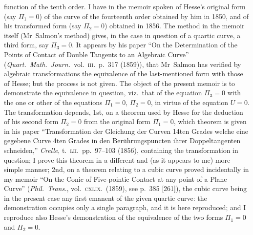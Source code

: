 \documentclass[11pt]{article}
\begin{document}
\noindent function of the tenth order. I have in the memoir spoken of Hesse's original form (say $\Pi_1 = 0$) of the curve of the fourteenth order obtained by him in 1850, and of his transformed form (say $\Pi_2 = 0$) obtained in 1856. The method in the memoir itself (Mr~Salmon's method) gives, in the case in question of a quartic curve, a third form, say $\Pi_3 = 0$. It appears by his paper ``On the Determination of the Points of Contact of Double Tangents to an Algebraic Curve'' (\textit{Quart.\ Math.\ Journ.}\ vol.~\textsc{iii}.\ p.~317 (1859)), that Mr~Salmon has verified by algebraic transformations the equivalence of the last-mentioned form with those of Hesse; but the process is not given. The object of the present memoir is to demonstrate the equivalence in question, viz.\ that of the equation $\Pi_3 = 0$ with the one or other of the equations $\Pi_1 = 0$, $\Pi_2 = 0$, in virtue of the equation $U = 0$. The transformation depends, 1st, on a theorem used by Hesse for the deduction of his second form $\Pi_2 = 0$ from the original form $\Pi_1 = 0$, which theorem is given in his paper ``Transformation der Gleichung der Curven 14ten Grades welche eine gegebene Curve 4ten Grades in den Ber\"uhrungspuncten ihrer Doppeltangenten schneiden,'' \textit{Crelle}, t.~\textsc{lii}.\ pp.~97--103 (1856), containing the transformation in question; I prove this theorem in a different and (as it appears to me) more simple manner; 2nd, on a theorem relating to a cubic curve proved incidentally in my memoir ``On the Conic of Five-pointic Contact at any point of a Plane Curve'' (\textit{Phil.\ Trans.}, vol.~\textsc{cxlix}.\ (1859), see p.~385 [261]), the cubic curve being in the present case any first emanent of the given quartic curve: the demonstration occupies only a single paragraph, and it is here reproduced; and I reproduce also Hesse's demonstration of the equivalence of the two forms $\Pi_1 = 0$ and $\Pi_2 = 0$.

\medskip
\end{document}

